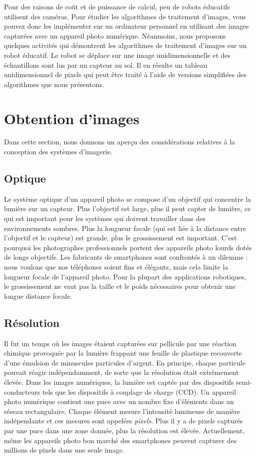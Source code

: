 Pour des raisons de coût et de puissance de calcul, peu de robots éducatifs utilisent des caméras. Pour étudier les algorithmes de traitement d'images, vous pouvez donc les implémenter sur un ordinateur personnel en utilisant des images capturées avec un appareil photo numérique. Néanmoins, nous proposons quelques activités qui démontrent les algorithmes de traitement d'images sur un robot éducatif. Le robot se déplace sur une image unidimensionnelle et des échantillons sont lus par un capteur au sol. Il en résulte un tableau unidimensionnel de pixels qui peut être traité à l'aide de versions simplifiées des algorithmes que nous présentons.

\section{Obtention d'images}\label{s.obtaining-images}

Dans cette section, nous donnons un aperçu des considérations relatives à la conception des systèmes d'imagerie.

\subsection*{Optique}
Le système optique d'un appareil photo se compose d'un objectif qui concentre la lumière sur un capteur. Plus l'objectif est large, plus il peut capter de lumière, ce qui est important pour les systèmes qui doivent travailler dans des environnements sombres. Plus la longueur focale (qui est liée à la distance entre l'objectif et le capteur) est grande, plus le grossissement est important. C'est pourquoi les photographes professionnels portent des appareils photo lourds dotés de longs objectifs. Les fabricants de smartphones sont confrontés à un dilemme : nous voulons que nos téléphones soient fins et élégants, mais cela limite la longueur focale de l'appareil photo. Pour la plupart des applications robotiques, le grossissement ne vaut pas la taille et le poids nécessaires pour obtenir une longue distance focale.

\subsection*{Résolution}

Il fut un temps où les images étaient capturées sur pellicule par une réaction chimique provoquée par la lumière frappant une feuille de plastique recouverte d'une émulsion de minuscules particules d'argent. En principe, chaque particule pouvait réagir indépendamment, de sorte que la résolution était extrêmement élevée. Dans les images numériques, la lumière est captée par des dispositifs semi-conducteurs tels que les dispositifs à couplage de charge (CCD). Un appareil photo numérique contient une puce avec un nombre fixe d'éléments dans un réseau rectangulaire. Chaque élément mesure l'intensité lumineuse de manière indépendante et ces mesures sont appelées \emph{pixels}. Plus il y a de pixels capturés par une puce dans une zone donnée, plus la résolution est élevée. Actuellement, même les appareils photo bon marché des smartphones peuvent capturer des millions de pixels dans une seule image.


